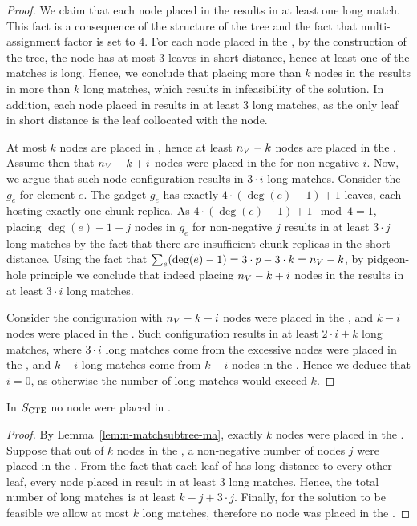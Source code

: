 \begin{proof}
 We claim that each node placed in the \MatchSubtree{} results in at least one long match.
This fact is a consequence of the structure of the tree and the fact that multi-assignment factor is set to $4$.
For each node placed in the \MatchSubtree{}, by the construction of the tree, the node has at most $3$ leaves in short distance, hence at least one of the matches is long.
Hence, we conclude that placing more than $k$ nodes in the \MatchSubtree{} results in more than $k$ long matches, which results in infeasibility of the solution.
In addition, each node placed in \UnqGadget{} results in at least $3$ long matches, as the only leaf in short distance is the leaf collocated with the node.

At most $k$ nodes are placed in \MatchSubtree{}, hence at least $n_V-k$ nodes are placed in the \CoverSubtree.
Assume then that $n_V-k+i$ nodes were placed in the \CoverSubtree{} for non-negative $i$.
Now, we argue that such node configuration results in $3\cdot i$ long matches.
Consider the \ElGadget{} $g_e$ for element $e$.
The gadget $g_e$ has exactly $4\cdot(\deg(e)-1)+1$ leaves, each hosting exactly one chunk replica.
As $4\cdot(\deg(e)-1)+1 \mod 4 = 1$, placing $\deg(e)-1+j$ nodes in $g_e$ for non-negative $j$ results in at least $3\cdot j$ long matches by the fact that there are insufficient chunk replicas in the short distance.
Using the fact that $\sum_e(\deg(e)-1) = 3\cdot p - 3\cdot k = n_V - k$, by pidgeon-hole principle we conclude that indeed placing $n_V-k+i$ nodes in the \CoverSubtree{} results in at least $3\cdot i$ long matches.

Consider the configuration with $n_V-k+i$ nodes were placed in the \CoverSubtree{}, and $k-i$ nodes were placed in the \MatchSubtree{}.
Such configuration results in at least $2\cdot i + k$ long matches, where $3\cdot i$ long matches come from the excessive nodes were placed in the \CoverSubtree{}, and $k-i$ long matches come from $k-i$ nodes in the \MatchSubtree{}.
Hence we deduce that $i = 0$, as otherwise the number of long matches would exceed $k$.

\end{proof}

\begin{lemma}
  In $S_{\mathrm{\textsc{CTE}}}$ no node were placed in \UnqGadget{}.
  \label{lem:no-unq-ma}
\end{lemma}
\begin{proof}
  By Lemma~\ref{lem:n-matchsubtree-ma}, exactly $k$ nodes were placed in the \MatchSubtree{}.
Suppose that out of $k$ nodes in the \MatchSubtree{}, a non-negative number of nodes $j$ were placed in the \UnqGadgets{}.
From the fact that each leaf of \UnqGadget{} has long distance to every other leaf, every node placed in \UnqGadget{} result in at least $3$ long matches.
Hence, the total number of long matches is at least $k-j + 3\cdot j$.
Finally, for the solution to be feasible we allow at most $k$ long matches, therefore no node was placed in the \UnqGadget{}.
\end{proof}

